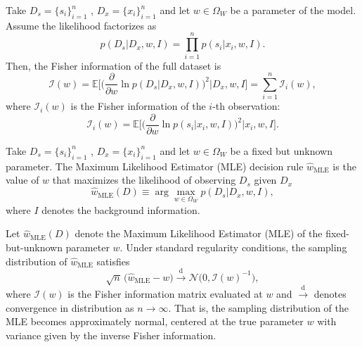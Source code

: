 \begin{theorem}
	\label{thm:fisher_sample}
	Take $D_s= \{s_i\}_{i=1}^n$ , $D_x = \{x_i\}_{i=1}^n$ and let $w \in \Omega_W$ be a parameter of the model. Assume the likelihood factorizes as
	\begin{equation}
		p(D_s | D_x, w, I) = \prod_{i=1}^{n} p(s_i | x_i, w, I).
	\end{equation}
	Then, the Fisher information of the full dataset is
	\begin{equation}
		\mathcal{I}(w) 
		= \mathbb{E}\Bigg[\Big(\frac{\partial}{\partial w} \ln p(D_s | D_x, w, I)\Big)^2 \Bigg| D_x, w, I \Bigg] 
		= \sum_{i=1}^{n} \mathcal{I}_i(w),
	\end{equation}
	where $\mathcal{I}_i(w)$ is the Fisher information of the $i$-th observation:
	\begin{equation}
		\mathcal{I}_i(w) = \mathbb{E}\Bigg[\Bigg(\frac{\partial}{\partial w} \ln p(s_i | x_i, w, I)\Bigg)^2 \Bigg| x_i, w, I \Bigg].
	\end{equation}
\end{theorem}

\begin{definition}
	\label{def:MLE}
	Take $D_s= \{s_i\}_{i=1}^n$ , $D_x = \{x_i\}_{i=1}^n$ and let $w \in \Omega_W$ be a fixed but unknown parameter. The Maximum Likelihood Estimator (MLE) decision rule $\hat{w}_{\mathrm{MLE}}$ is the value of $w$ that maximizes the likelihood of observing $D_s$ given $D_x$
	\begin{equation}
		\hat{w}_{\mathrm{MLE}}(D) \equiv \arg \max_{w \in \Omega_W} p(D_s | D_x, w, I),
	\end{equation}
	where $I$ denotes the background information.
\end{definition}

\begin{theorem}
	\label{thm:unbiased_mle}
	Let $\hat{w}_{\mathrm{MLE}}(D)$ denote the Maximum Likelihood Estimator (MLE) of the fixed-but-unknown parameter $w$. Under standard regularity conditions, the sampling distribution of $\hat{w}_{\mathrm{MLE}}$ satisfies
	\begin{equation}
		\sqrt{n}\,\big(\hat{w}_{\mathrm{MLE}} - w\big) \xrightarrow{\text{d}} \mathcal{N}\big(0, \mathcal{I}(w)^{-1}\big),
	\end{equation}
	where $\mathcal{I}(w)$ is the Fisher information matrix evaluated at $w$ and $\xrightarrow{\text{d}}$ denotes convergence in distribution as $n \to \infty$. 
	That is, the sampling distribution of the MLE becomes approximately normal, centered at the true parameter $w$ with variance given by the inverse Fisher information.
\end{theorem}


